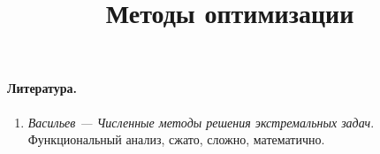 \documentclass[12pt]{article}
\theoremstyle{algorithm}
\theoremstyle{example}
\theoremstyle{plain}
\theoremstyle{definition}
\theoremstyle{remark}
\numberwithin{remark}{section}
\begin{document}
\title{Методы оптимизации}
\maketitle
\tableofcontents

\newpage
\paragraph{Литература.}
\begin{enumerate}
  \item \emph{Васильев --- Численные методы решения экстремальных задач}.
    Функциональный анализ, сжато, сложно, математично.
\end{enumerate}






\end{document}
